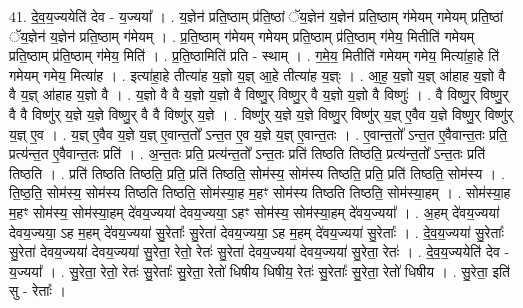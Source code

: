 \documentclass[17pt]{extarticle}
\begin{document}
41. दे॒व॒य॒ज्ययेति॑ देव - य॒ज्यया᳚ । . य॒ज्ञेन॑ प्रति॒ष्ठाम् प्र॑ति॒ष्ठां ॅय॒ज्ञेन॑ य॒ज्ञेन॑ प्रति॒ष्ठाम् ग॑मेयम् गमेयम् प्रति॒ष्ठां ॅय॒ज्ञेन॑ य॒ज्ञेन॑ प्रति॒ष्ठाम् ग॑मेयम् । . प्र॒ति॒ष्ठाम् ग॑मेयम् गमेयम् प्रति॒ष्ठाम् प्र॑ति॒ष्ठाम् ग॑मेय॒ मितीति॑ गमेयम् प्रति॒ष्ठाम् प्र॑ति॒ष्ठाम् ग॑मेय॒ मिति॑ । . प्र॒ति॒ष्ठामिति॑ प्रति - स्थाम् । . ग॒मे॒य॒ मितीति॑ गमेयम् गमेय॒ मित्या॑हा॒हे ति॑ गमेयम् गमेय॒ मित्या॑ह । . इत्या॑हा॒हे तीत्या॑ह य॒ज्ञो य॒ज्ञ् आ॒हे तीत्या॑ह य॒ज्ञ्ः । . आ॒ह॒ य॒ज्ञो य॒ज्ञ् आ॑हाह य॒ज्ञो वै वै य॒ज्ञ् आ॑हाह य॒ज्ञो वै । . य॒ज्ञो वै वै य॒ज्ञो य॒ज्ञो वै विष्णु॒र् विष्णु॒र् वै य॒ज्ञो य॒ज्ञो वै विष्णुः॑ । . वै विष्णु॒र् विष्णु॒र् वै वै विष्णु॑र् य॒ज्ञे य॒ज्ञे विष्णु॒र् वै वै विष्णु॑र् य॒ज्ञे । . विष्णु॑र् य॒ज्ञे य॒ज्ञे विष्णु॒र् विष्णु॑र् य॒ज्ञ् ए॒वैव य॒ज्ञे विष्णु॒र् विष्णु॑र् य॒ज्ञ् ए॒व । . य॒ज्ञ् ए॒वैव य॒ज्ञे य॒ज्ञ् ए॒वान्त॒तो᳚ ऽन्त॒त ए॒व य॒ज्ञे य॒ज्ञ् ए॒वान्त॒तः । . ए॒वान्त॒तो᳚ ऽन्त॒त ए॒वैवान्त॒तः प्रति॒ प्रत्य॑न्त॒त ए॒वैवान्त॒तः प्रति॑ । . अ॒न्त॒तः प्रति॒ प्रत्य॑न्त॒तो᳚ ऽन्त॒तः प्रति॑ तिष्ठति तिष्ठति॒ प्रत्य॑न्त॒तो᳚ ऽन्त॒तः प्रति॑ तिष्ठति । . प्रति॑ तिष्ठति तिष्ठति॒ प्रति॒ प्रति॑ तिष्ठति॒ सोम॑स्य॒ सोम॑स्य तिष्ठति॒ प्रति॒ प्रति॑ तिष्ठति॒ सोम॑स्य । . ति॒ष्ठ॒ति॒ सोम॑स्य॒ सोम॑स्य तिष्ठति तिष्ठति॒ सोम॑स्या॒ह म॒हꣳ सोम॑स्य तिष्ठति तिष्ठति॒ सोम॑स्या॒हम् । . सोम॑स्या॒ह म॒हꣳ सोम॑स्य॒ सोम॑स्या॒हम् दे॑वय॒ज्यया॑ देवय॒ज्यया॒ ऽहꣳ सोम॑स्य॒ सोम॑स्या॒हम् दे॑वय॒ज्यया᳚ । . अ॒हम् दे॑वय॒ज्यया॑ देवय॒ज्यया॒ ऽह म॒हम् दे॑वय॒ज्यया॑ सु॒रेताः᳚ सु॒रेता॑ देवय॒ज्यया॒ ऽह म॒हम् दे॑वय॒ज्यया॑ सु॒रेताः᳚ । . दे॒व॒य॒ज्यया॑ सु॒रेताः᳚ सु॒रेता॑ देवय॒ज्यया॑ देवय॒ज्यया॑ सु॒रेता॒ रेतो॒ रेतः॑ सु॒रेता॑ देवय॒ज्यया॑ देवय॒ज्यया॑ सु॒रेता॒ रेतः॑ । . दे॒व॒य॒ज्ययेति॑ देव - य॒ज्यया᳚ । . सु॒रेता॒ रेतो॒ रेतः॑ सु॒रेताः᳚ सु॒रेता॒ रेतो॑ धिषीय धिषीय॒ रेतः॑ सु॒रेताः᳚ सु॒रेता॒ रेतो॑ धिषीय । . सु॒रेता॒ इति॑ सु - रेताः᳚ । \newline
\pagebreak
{}
\end{document}
